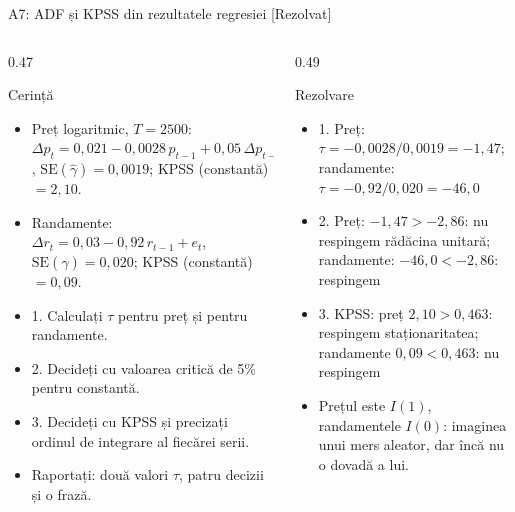 \begin{frame}{A7: ADF și KPSS din rezultatele regresiei [Rezolvat]}
\itemsize{\scriptsize}
\begin{columns}[T]
\begin{column}{0.47\textwidth}
\begin{block}{Cerință}
\begin{itemize}
    \item Preț logaritmic, $T = 2500$: $\Delta p_t = 0{,}021 - 0{,}0028\,p_{t-1} + 0{,}05\,\Delta p_{t-1} + e_t$, $\mathrm{SE}(\hat\gamma) = 0{,}0019$; KPSS (constantă) $= 2{,}10$.
    \item Randamente: $\Delta r_t = 0{,}03 - 0{,}92\,r_{t-1} + e_t$, $\mathrm{SE}(\hat\gamma) = 0{,}020$; KPSS (constantă) $= 0{,}09$.
    \item 1. Calculați $\tau$ pentru preț și pentru randamente.
    \item 2. Decideți cu valoarea critică de 5\% pentru constantă.
    \item 3. Decideți cu KPSS și precizați ordinul de integrare al fiecărei serii.
    \item Raportați: două valori $\tau$, patru decizii și o frază.
\end{itemize}
\end{block}
\end{column}
\begin{column}{0.49\textwidth}
\begin{exampleblock}{Rezolvare}
\begin{itemize}
    \item 1. Preț: $\tau = -0{,}0028/0{,}0019 = -1{,}47$; randamente: $\tau = -0{,}92/0{,}020 = -46{,}0$
    \item 2. Preț: $-1{,}47 > -2{,}86$: nu respingem rădăcina unitară; randamente: $-46{,}0 < -2{,}86$: respingem
    \item 3. KPSS: preț $2{,}10 > 0{,}463$: respingem staționaritatea; randamente $0{,}09 < 0{,}463$: nu respingem
    \item Prețul este $I(1)$, randamentele $I(0)$: imaginea unui mers aleator, dar încă nu o dovadă a lui.
\end{itemize}
\end{exampleblock}
\end{column}
\end{columns}
\end{frame}

